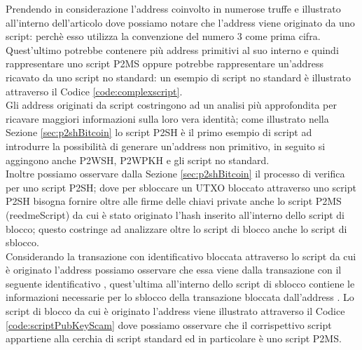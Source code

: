  \begin{example}\label{ex:probleGraphAddress}
   Prendendo in considerazione l'address  coinvolto in numerose truffe e illustrato all'interno dell'articolo \cite{DBLP:conf/icdm/OggierPD18} dove possiamo notare che l'address viene originato da uno script: perchè esso utilizza la convenzione del numero 3 come prima cifra.
   Quest'ultimo potrebbe contenere più address primitivi al suo interno e quindi rappresentare uno script P2MS oppure potrebbe rappresentare un'address ricavato da uno script no standard: un esempio di script no standard è illustrato attraverso il Codice \ref{code:complexscript}.\\
   Gli address originati da script costringono ad un analisi più approfondita per ricavare maggiori informazioni sulla loro vera identità; come illustrato nella Sezione \ref{sec:p2shBitcoin} lo script P2SH è il primo esempio di script ad introdurre la possibilità di generare un'address non primitivo, in seguito si aggingono anche P2WSH, P2WPKH e gli script no standard.\\
   Inoltre possiamo osservare dalla Sezione \ref{sec:p2shBitcoin} il processo di verifica per uno script P2SH; dove per sbloccare un UTXO bloccato attraverso uno script P2SH bisogna fornire oltre alle firme delle chiavi private anche lo script P2MS (reedmeScript) da cui è stato originato l'hash inserito all'interno dello script di blocco; questo costringe ad analizzare oltre lo script di blocco anche lo script di sblocco.\\
   Considerando la transazione con identificativo  bloccata attraverso lo script da cui è originato l'address  possiamo osservare che essa viene  dalla transazione con il seguente identificativo , quest'ultima all'interno dello script di sblocco contiene le informazioni necessarie per lo sblocco della transazione bloccata dall'address .
   Lo script di blocco da cui è originato l'address viene illustrato attraverso il Codice \ref{code:scriptPubKeyScam} dove possiamo osservare che il corrispettivo script appartiene alla cerchia di script standard ed in particolare è uno script P2MS.
   \begin{lstlisting}[language=bitcoinscript, label={code:scriptPubKeyScam}, caption={Script da cui è originato l'address preso in esempio.}]

\end{lstlisting}
\end{example}
